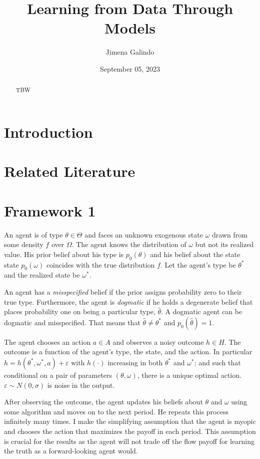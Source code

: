 \documentclass[
  12pt,
]{article}
\title{Learning from Data Through Models}
\author{Jimena Galindo}
\date{September 05, 2023}
\begin{document}
\maketitle
\begin{abstract}
TBW
\end{abstract}

\hypertarget{introduction}{%
\section{Introduction}\label{introduction}}

\hypertarget{related-literature}{%
\section{Related Literature}\label{related-literature}}

\hypertarget{framework-1}{%
\section{Framework 1}\label{framework-1}}

An agent is of type \(\theta \in \Theta\) and faces an unknown exogenous
state \(\omega\) drawn from some density \(f\) over \(\Omega\). The
agent knows the distribution of \(\omega\) but not its realized value.
His prior belief about his type is \(p_0(\theta)\) and his belief about
the state state \(p_0(\omega)\) coincides with the true distribution
\(f\). Let the agent's type be \(\theta^*\) and the realized state be
\(\omega^*\).

An agent has a \emph{misspecified} belief if the prior assigns
probability zero to their true type. Furthermore, the agent is
\emph{dogmatic} if he holds a degenerate belief that places probability
one on being a particular type, \(\hat{\theta}\). A dogmatic agent can
be dogmatic and misspecified. That means that
\(\hat{\theta} \neq \theta^*\) and \(p_0(\hat{\theta}) = 1\).

The agent chooses an action \(a\in A\) and observes a noisy outcome
\(h\in H\). The outcome is a function of the agent's type, the state,
and the action. In particular
\(h = h(\theta^*, \omega^*, a) + \varepsilon\) with \(h(\cdot)\)
increasing in both \(\theta^*\) and \(\omega^*\); and such that
conditional on a pair of parameters \((\theta, \omega)\), there is a
unique optimal action. \(\varepsilon\sim N(0, \sigma)\) is noise in the
output.

After observing the outcome, the agent updates his beliefs about
\(\theta\) and \(\omega\) using some algorithm and moves on to the next
period. He repeats this process infinitely many times. I make the
simplifying assumption that the agent is myopic and chooses the action
that maximizes the payoff in each period. This assumption is crucial for
the results as the agent will not trade off the flow payoff for learning
the truth as a forward-looking agent would.
\end{document}
